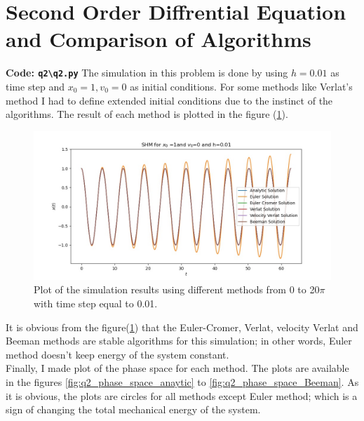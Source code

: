 \documentclass[12pt, a4paper]{article}
\begin{document}
	\section{Second Order Diffrential Equation and Comparison of Algorithms}
	\textbf{Code: \texttt{q2\textbackslash q2.py}}
	\newline
	The simulation in this problem is done by using $h = 0.01$ as time step and $x_0 = 1, v_0 = 0$ as initial conditions.
	For some methods like Verlat's method I had to define extended initial conditions due to the instinct of the algorithms. 
	The result of each method is plotted in the figure (\ref{fig:q2_results_of_methods}).
		\begin{figure}[h]
			\centering
			\includegraphics[width=0.8\linewidth]{../q2/q2_x_t_0_62.83185307179586_0.01_x0=1_v0=0.jpg}
			\caption{Plot of the simulation results using different methods from 0 to 20$\pi$ with time step equal to 0.01.}
			\label{fig:q2_results_of_methods}
		\end{figure}
	It is obvious from the figure(\ref{fig:q2_results_of_methods}) that the Euler-Cromer, Verlat, velocity Verlat and Beeman methods are stable algorithms for this simulation; in other words,
	Euler method doesn't keep energy of the system constant.\\
	Finally, I made plot of the phase space for each method. The plots are available in the 
	figures \ref{fig:q2_phase_space_anaytic} to \ref{fig:q2_phase_space_Beeman}. As it is 
	obvious, the plots are circles for all methods except Euler method; which is a sign of 
	changing the total mechanical energy of the system.
\end{document}
